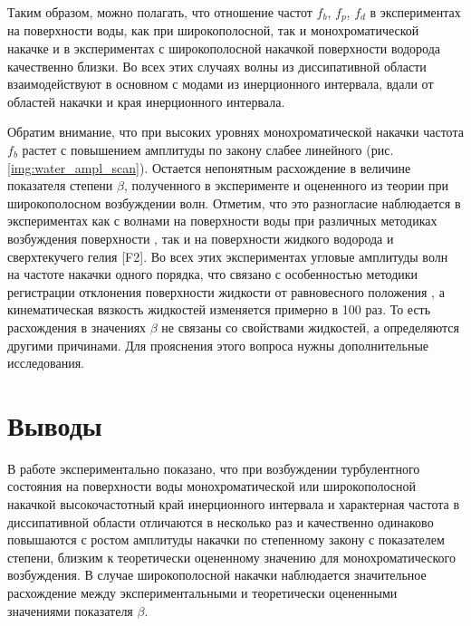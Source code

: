 Таким образом, можно полагать, что отношение частот $f_b$, $f_p$, $f_d$ в экспериментах на поверхности воды, как при широкополосной, так и монохроматической накачке и в экспериментах с широкополосной накачкой поверхности водорода качественно близки. Во всех этих случаях волны из диссипативной области взаимодействуют в основном с модами из инерционного интервала, вдали от областей накачки и края инерционного интервала.

Обратим внимание, что при высоких уровнях монохроматической накачки частота $f_b$ растет с повышением амплитуды по закону слабее линейного (рис. \ref{img:water_ampl_scan}). Остается непонятным расхождение в величине показателя степени $\beta$, полученного в эксперименте и оцененного из теории при широкополосном возбуждении волн. Отметим, что это разногласие наблюдается в экспериментах как с волнами на поверхности воды при различных методиках возбуждения поверхности \cite{Brazhnikov_EPL}, так и на поверхности жидкого водорода \cite{Brazhnikov_liq_hydr} и сверхтекучего гелия [F2]. Во всех этих экспериментах угловые амплитуды волн на частоте накачки одного порядка, что связано с особенностью методики регистрации отклонения поверхности жидкости от равновесного положения \cite{Brazhnikov_IET}, а кинематическая вязкость жидкостей изменяется примерно в 100 раз. То есть расхождения в значениях $\beta$ не связаны со свойствами жидкостей, а определяются другими причинами. Для прояснения этого вопроса нужны дополнительные исследования.

\section{Выводы} %


В работе экспериментально показано, что при возбуждении турбулентного состояния на поверхности воды монохроматической или широкополосной накачкой высокочастотный край инерционного интервала и характерная частота в диссипативной области отличаются в несколько раз и качественно одинаково повышаются с ростом амплитуды накачки по степенному закону с показателем степени, близким к теоретически оцененному значению для монохроматического возбуждения. В случае широкополосной накачки наблюдается значительное расхождение между экспериментальными и теоретически оцененными значениями показателя $\beta$.

%
%

\clearpage

